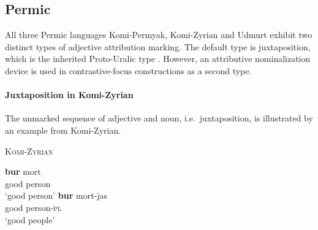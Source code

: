 \subsection{Permic}
All three Permic languages Komi-Permyak, Komi-Zyrian and Udmurt exhibit two distinct types of adjective attribution marking. The default type is juxtaposition, which is the inherited Proto-Uralic type \citep[80–81]{decsy1990}. However, an attributive nominalization device is used in contrastive-focus constructions as a second type.

\paragraph{Juxtaposition in Komi-Zyrian}
The unmarked sequence of adjective and noun, i.e.~juxtaposition, is illustrated by an example from Komi-Zyrian.
\begin{exe}
\ex \textsc{Komi-Zyrian} \citep[287]{lytkin1966a}
\begin{xlist} 
\ex
\gll 		\textbf{bur} 	mort\\
		good	person\\
\glt		‘good person’
\ex
\gll		\textbf{bur}	mort-jas\\
		good	person-\textsc{pl}\\
\glt		‘good people’
\end{xlist}
\end{exe}

